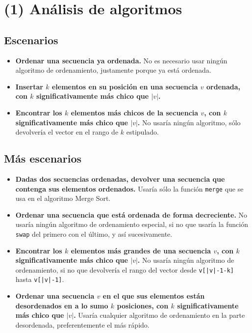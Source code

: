 \documentclass[12 pt]{article}
\begin{document}
\section*{(1) Análisis de algoritmos}
    \subsection*{Escenarios}  
        \begin{itemize}
            \item \textbf{Ordenar una secuencia ya ordenada.} No es necesario usar ningún algoritmo de ordenamiento, justamente porque ya está ordenada.
            \item \textbf{Insertar $k$ elementos en su posición en una secuencia $v$ ordenada,
            con $k$ significativamente más chico que $|v|$.}
            \item \textbf{Encontrar los $k$ elementos más chicos de la secuencia $v$, con $k$
            significativamente más chico que $|v|$.} No usaría ningún algoritmo, sólo devolvería el vector en el rango de $k$ estipulado.
        \end{itemize}
    \subsection*{Más escenarios}
        \begin{itemize}
            \item \textbf{Dadas dos secuencias ordenadas, devolver una secuencia que
            contenga sus elementos ordenados.} Usaría sólo la función \texttt{merge} que se usa en el algoritmo Merge Sort.
            \item \textbf{Ordenar una secuencia que está ordenada de forma decreciente.} No usaría ningún algoritmo de ordenamiento especial, si no que usaría la función \texttt{swap} del primero con el último, y así sucesivamente.
            \item \textbf{Encontrar los $k$ elementos más grandes de una secuencia $v$, con $k$
            significativamente más chico que $|v|$.} No usaría ningún algoritmo de ordenamiento, si no que devolvería el rango del vector desde \texttt{v[|v|-1-k]} hasta \texttt{v[|v|-1]}.
            \item \textbf{Ordenar una secuencia $v$ en el que sus elementos están desordenados en a lo sumo $k$ posiciones, con $k$ signiﬁcativamente más chico que $|v|$.} Usaría cualquier algoritmo de ordenamiento en la parte desordenada, preferentemente el más rápido.
        \end{itemize}
\end{document}
